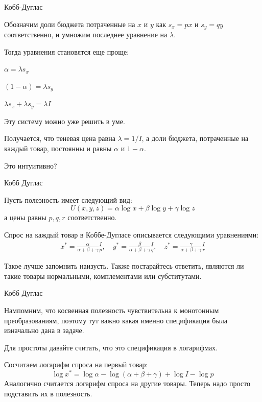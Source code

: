 \documentclass{beamer}
\begin{document}
\begin{frame}{Кобб-Дуглас}

Обозначим доли бюджета потраченные на $x$ и $y$ как $s_x= px$ и $s_y = qy$ соответственно, и умножим последнее уравнение на $\lambda$. 

Тогда уравнения становятся еще проще:

$\alpha = \lambda s_x$

$(1-\alpha) = \lambda s_y$

$\lambda s_x + \lambda s_y = \lambda I$

Эту систему можно уже решить в уме. 

Получается, что теневая цена равна $\lambda = 1/I$, а доли бюджета, потраченные на каждый товар, постоянны и равны $\alpha$ и $1-\alpha$.

Это интуитивно?

\end{frame}

\begin{frame}{Кобб Дуглас}

Пусть полезность имеет следующий вид:
$$U(x,y,z) = \alpha \log x + \beta \log y + \gamma \log z$$ 
а цены равны $p, q, r$ соответственно.

Спрос на каждый товар в Коббе-Дугласе описывается следующими уравнениями:
\begin{gather*}
x^{\ast} = \frac{\alpha}{\alpha + \beta + \gamma} \frac{I}{p}, \quad
y^{\ast} = \frac{\beta}{\alpha + \beta + \gamma} \frac{I}{q}, \quad
z^{\ast} = \frac{\gamma}{\alpha + \beta + \gamma} \frac{I}{r}
\end{gather*}

Такое лучше запомнить наизусть. Также постарайтесь ответить, являются ли такие товары нормальными, комплементами или субститутами.

\end{frame}

\begin{frame}{Кобб Дуглас}

Нампомним, что косвенная полезность чувствительна к монотонным преобразованиям, поэтому тут важно какая именно спецификация была изначально дана в задаче. 

Для простоты давайте считать, что это спецификация в логарифмах.

Сосчитаем логарифм спроса на первый товар:
$$\log x^{\ast} = \log \alpha - \log (\alpha + \beta + \gamma) + \log I - \log p$$
Аналогично считается логарифм спроса на другие товары. Теперь надо просто подставить их в полезность.

\end{frame}
\end{document}

